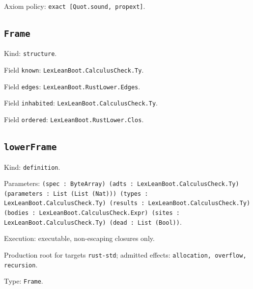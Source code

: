 \documentclass[11pt]{article}
\begin{document}
\noindent Axiom policy: \texttt{exact [Quot.sound, propext]}.\par
\subsection*{\texttt{Frame}}
\noindent Kind: \texttt{structure}.\par
\noindent Field \texttt{known}: \texttt{LexLeanBoot.CalculusCheck.Ty}.\par
\noindent Field \texttt{edges}: \texttt{LexLeanBoot.RustLower.Edges}.\par
\noindent Field \texttt{inhabited}: \texttt{LexLeanBoot.CalculusCheck.Ty}.\par
\noindent Field \texttt{ordered}: \texttt{LexLeanBoot.RustLower.Clos}.\par
\subsection*{\texttt{lowerFrame}}
\noindent Kind: \texttt{definition}.\par
\noindent Parameters: \texttt{(spec : ByteArray) (adts : LexLeanBoot.CalculusCheck.Ty) (parameters : List (List (Nat))) (types : LexLeanBoot.CalculusCheck.Ty) (results : LexLeanBoot.CalculusCheck.Ty) (bodies : LexLeanBoot.CalculusCheck.Expr) (sites : LexLeanBoot.CalculusCheck.Ty) (dead : List (Bool))}.\par
\noindent Execution: executable, non-escaping closures only.\par
\noindent Production root for targets \texttt{rust-std}; admitted effects: \texttt{allocation, overflow, recursion}.\par
\noindent Type: \texttt{Frame}.\par
\end{document}
